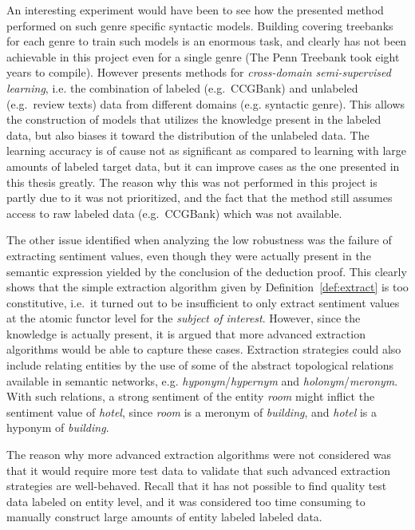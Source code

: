 An interesting experiment would have been to see how the presented method performed on such genre specific syntactic models.   Building covering treebanks for each genre to train such models is an enormous task, and clearly has not been achievable in this project even for a single genre (The Penn Treebank took eight years to compile). However \citeauthor{as}  presents methods for \emph{cross-domain semi-supervised learning}, i.e. the combination of labeled (e.g.\ CCGBank) and unlabeled (e.g.\ review texts) data from different domains (e.g. syntactic genre). This allows the construction of models that utilizes the knowledge present in the labeled data, but also biases it toward the distribution of the unlabeled data. The learning accuracy is of cause not as significant as compared to learning with large amounts of labeled target data, but it can improve cases as the one presented in this thesis greatly. The reason why this was not performed in this project is partly due to it was not prioritized, and the fact that the method still assumes access to raw labeled data (e.g.\ CCGBank) which was not available.

The other issue identified when analyzing the low robustness was the failure of extracting sentiment values, even though they were actually present in the semantic expression yielded by the conclusion of the deduction proof. This clearly shows that the simple extraction algorithm given by Definition~\ref{def:extract} is too constitutive, i.e.\ it turned out to be insufficient to only extract sentiment values at the atomic functor level for the \emph{subject of interest}. However, since the knowledge is actually present, it is argued that more advanced extraction algorithms would be able to capture these cases. Extraction strategies could also include relating entities by the use of some of the abstract topological relations available in semantic networks, e.g. \emph{hyponym}/\emph{hypernym} and \emph{holonym}/\emph{meronym}. With such relations, a strong sentiment of the entity \emph{room} might inflict the sentiment value of \emph{hotel}, since \emph{room} is a meronym of \emph{building}, and \emph{hotel} is a hyponym of \emph{building}.


The reason why more advanced extraction algorithms were not considered was that it would require more test data to validate that such advanced extraction strategies are well-behaved. %
Recall that it has not possible to find quality test data labeled on entity level, and it was considered  too time consuming to manually construct large amounts of entity labeled labeled data.

